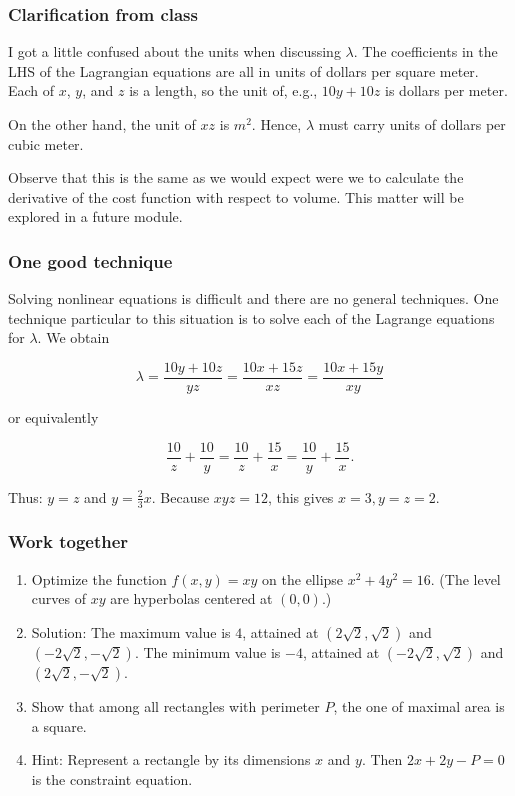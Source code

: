 \documentclass[11pt,ignorenonframetext,aspectratio=169,xcolor={svgnames}]{beamer}
\begin{document}
\begin{frame}\frametitle{Clarification from class}

I got a little confused about the units when discussing $\lambda$. The
coefficients in the LHS of the Lagrangian equations are all in units of
dollars per square meter. Each of $x$, $y$, and $z$ is a length, so the
unit of, e.g., $10y + 10z$ is dollars per meter.

On the other hand, the unit of $xz$ is $\si{m^2}$. Hence, $\lambda$ must
carry units of dollars per cubic meter.

Observe that this is the same as we would expect were we to calculate
the derivative of the cost function with respect to volume. This matter
will be explored in a future module.

\end{frame}

\begin{frame}\frametitle{One good technique}

Solving nonlinear equations is difficult and there are no general
techniques. One technique particular to this situation is to solve each
of the Lagrange equations for $\lambda$. We obtain

\[ \lambda = \frac{10y + 10z}{yz} = \frac{10x + 15z}{xz} = \frac{10x + 15y}{xy} \]

or equivalently

\[ \frac{10}{z} + \frac{10}{y} = \frac{10}{z} + \frac{15}{x} = \frac{10}{y} + \frac{15}{x}. \]

Thus: $y = z$ and $y = \frac{2}{3}x$. Because $xyz = 12$, this gives
$x = 3, y = z = 2$.

\end{frame}

\begin{frame}\frametitle{Work together}

\begin{enumerate}
\item
  Optimize the function $f(x,y) = xy$ on the ellipse $x^2 + 4y^2 = 16$.
  (The level curves of $xy$ are hyperbolas centered at $(0,0)$.)
\pause
\item Solution: The maximum value is $4$, attained at $(2 \sqrt 2, \sqrt{2})$
and $(-2 \sqrt 2, -\sqrt{2})$. The minimum value is $-4$, attained at
$(-2 \sqrt 2, \sqrt{2})$ and $(2 \sqrt 2, -\sqrt{2})$.
\item
  Show that among all rectangles with perimeter $P$, the one of maximal
  area is a square.
\pause
\item Hint: Represent a rectangle by its dimensions $x$ and $y$. Then
$2x + 2y - P = 0$ is the constraint equation.
\end{enumerate}

\end{frame}
\end{document}
